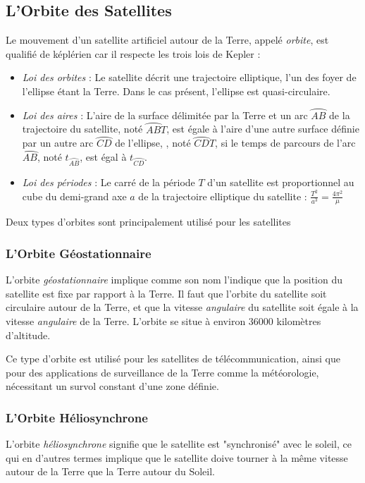 \documentclass[a4paper, 11pt]{report}
\begin{document}
\subsection{L'Orbite des Satellites}
Le mouvement d'un satellite artificiel autour de la Terre, appelé \emph{orbite}, est qualifié de képlérien car il respecte les trois lois de Kepler :
\begin{itemize}
	\item \emph{Loi des orbites} : Le satellite décrit une trajectoire elliptique, l'un des foyer de l'ellipse étant la Terre. Dans le cas présent, l'ellipse est quasi-circulaire.
	\item \emph{Loi des aires} : L'aire de la surface délimitée par la Terre et un arc $\wideparen{AB}$ de la trajectoire du satellite, noté $\wideparen{AB}T$, est égale à l'aire d'une autre surface définie par un autre arc $\wideparen{CD}$ de l'ellipse, , noté $\wideparen{CD}T$, si le temps de parcours de l'arc $\wideparen{AB}$, noté $t_{\wideparen{AB}}$, est égal à $t_{\wideparen{CD}}$.
	\item \emph{Loi des périodes} : Le carré de la période $T$ d'un satellite est proportionnel au cube du demi-grand axe $a$ de la trajectoire elliptique du satellite : $\frac{T^2}{a^3} = \frac{4 \pi^2}{\mu}$
\end{itemize}
Deux types d'orbites sont principalement utilisé pour les satellites
\subsubsection{L'Orbite Géostationnaire}
L'orbite \emph{géostationnaire} implique comme son nom l'indique que la position du satellite est fixe par rapport à la Terre.
Il faut que l'orbite du satellite soit circulaire autour de la Terre, et que la vitesse \emph{angulaire} du satellite soit égale à la vitesse \emph{angulaire} de la Terre. L'orbite se situe à environ 36000 kilomètres d'altitude.

Ce type d'orbite est utilisé pour les satellites de télécommunication, ainsi que pour des applications de surveillance de la Terre comme la météorologie, nécessitant un survol constant d'une zone définie.
\subsubsection{L'Orbite Héliosynchrone}
L'orbite \emph{héliosynchrone} signifie que le satellite est "synchronisé" avec le soleil, ce qui en d'autres termes implique que le satellite doive tourner à la même vitesse autour de la Terre que la Terre autour du Soleil.
\end{document}
